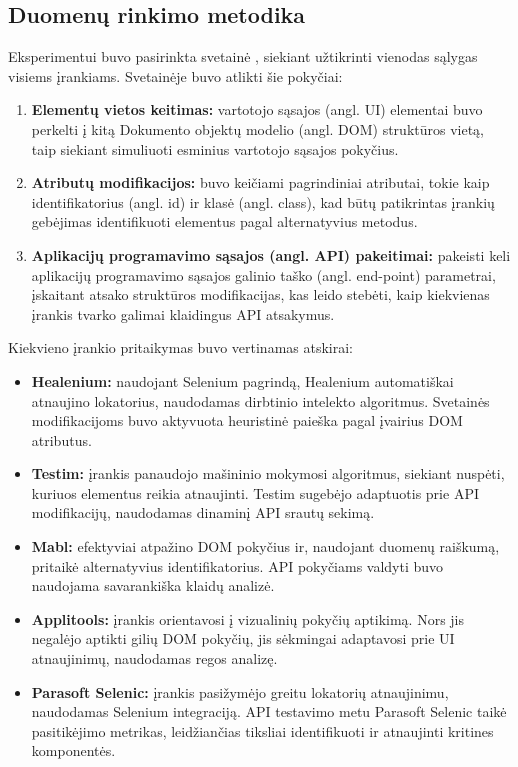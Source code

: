 \documentclass[
]{VUMIFPSkursinis}
\begin{document}
\subsection{Duomenų rinkimo metodika}

Eksperimentui buvo pasirinkta svetainė \cite{Demo}, siekiant užtikrinti vienodas sąlygas visiems įrankiams. Svetainėje buvo atlikti šie pokyčiai:

\begin{enumerate}
    \item \textbf{Elementų vietos keitimas:} vartotojo sąsajos (angl. UI) elementai buvo perkelti į kitą Dokumento objektų modelio (angl. DOM) struktūros vietą, taip siekiant simuliuoti esminius vartotojo sąsajos pokyčius.
    \item \textbf{Atributų modifikacijos:} buvo keičiami pagrindiniai atributai, tokie kaip identifikatorius (angl. id) ir klasė (angl. class), kad būtų patikrintas įrankių gebėjimas identifikuoti elementus pagal alternatyvius metodus.
    \item \textbf{Aplikacijų programavimo sąsajos (angl. API) pakeitimai:}  pakeisti keli aplikacijų programavimo sąsajos galinio taško (angl. end-point) parametrai, įskaitant atsako struktūros modifikacijas, kas leido stebėti, kaip kiekvienas įrankis tvarko galimai klaidingus API atsakymus.
\end{enumerate}

Kiekvieno įrankio pritaikymas buvo vertinamas atskirai:

\begin{itemize}
    \item \textbf{Healenium:} naudojant Selenium pagrindą, Healenium automatiškai atnaujino lokatorius, naudodamas dirbtinio intelekto algoritmus. Svetainės modifikacijoms buvo aktyvuota heuristinė paieška pagal įvairius DOM atributus.
    \item \textbf{Testim:} įrankis panaudojo mašininio mokymosi algoritmus, siekiant nuspėti, kuriuos elementus reikia atnaujinti. Testim sugebėjo adaptuotis prie API modifikacijų, naudodamas dinaminį API srautų sekimą.
    \item \textbf{Mabl:} efektyviai atpažino DOM pokyčius ir, naudojant duomenų raiškumą, pritaikė alternatyvius identifikatorius. API pokyčiams valdyti buvo naudojama savarankiška klaidų analizė.
    \item \textbf{Applitools: } įrankis orientavosi į vizualinių pokyčių aptikimą. Nors jis negalėjo aptikti gilių DOM pokyčių, jis sėkmingai adaptavosi prie UI atnaujinimų, naudodamas regos analizę.
    \item \textbf{Parasoft Selenic:} įrankis pasižymėjo greitu lokatorių atnaujinimu, naudodamas Selenium integraciją. API testavimo metu Parasoft Selenic taikė pasitikėjimo metrikas, leidžiančias tiksliai identifikuoti ir atnaujinti kritines komponentės.
\end{itemize}
\end{document}
